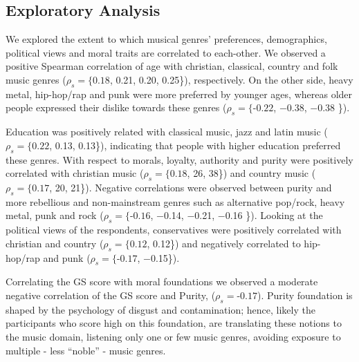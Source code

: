\documentclass{article}
\begin{document}
\subsection{Exploratory Analysis}

We explored the extent to which musical genres’ preferences, demographics, political views and moral traits are correlated to each-other. We observed a positive Spearman correlation of age with christian,  classical,  country  and  folk  music  genres ($\rho_{s} = \{0.18$, 0.21, 0.20, 0.25\}),  respectively.
On the other side, heavy metal, hip-hop/rap and punk were more preferred by younger ages, whereas older people expressed their dislike towards these genres ($\rho_{s} = \{$-$0.22$,  $-$0.38,  $-$0.38 \}).

Education was positively related with classical music, jazz and latin music ($\rho_{s} = \{0.22$, 0.13, 0.13\}), indicating that people with higher education preferred these genres. With respect to morals, loyalty, authority and purity were positively correlated with christian music ($\rho_{s}=\{0.18$, 26, 38\}) and country music ($\rho_{s}=\{0.17$, 20, 21\}). %
Negative correlations were observed between purity and more rebellious and non-mainstream genres such as alternative pop/rock, heavy metal, punk  and rock ($\rho_{s}=\{$-$0.16$, $-$0.14,  $-$0.21, $-$0.16 \}). 
Looking at the political views of the respondents, conservatives were positively correlated with christian and country ($\rho_{s} =\{ 0.12$, 0.12\}) and negatively correlated to hip-hop/rap and punk ($\rho_{s} = \{$-$0.17$, $-$0.15\}). 


Correlating the GS score with moral foundations we observed a moderate negative correlation of the GS score and Purity,  ($\rho_{s}=$-$ 0.17$). Purity foundation is shaped by the psychology of disgust and contamination; hence, likely the participants who score high on this foundation, are translating these notions to the music domain, listening only one or few music genres, avoiding exposure to multiple - less ``noble'' - music genres.
\end{document}
